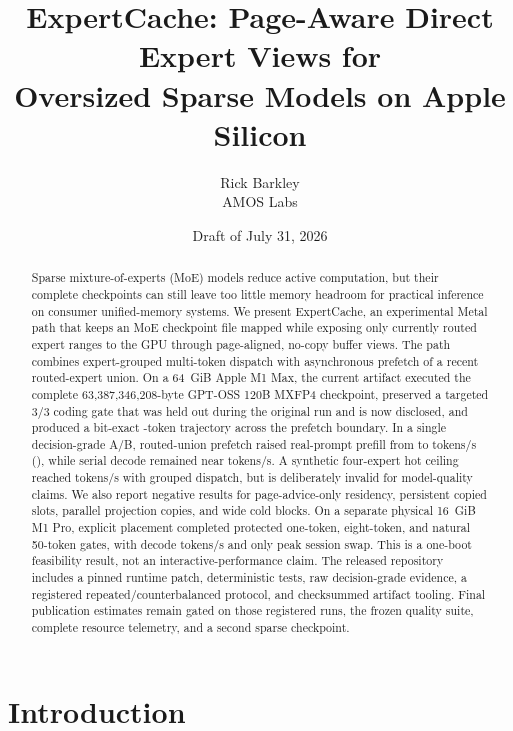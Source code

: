 \documentclass[10pt,twocolumn]{article}
\title{ExpertCache: Page-Aware Direct Expert Views for\\
Oversized Sparse Models on Apple Silicon}
\author{Rick Barkley\\AMOS Labs}
\date{Draft of July 31, 2026}
\newcommand{\system}{ExpertCache}
\begin{document}
\maketitle

\begin{abstract}
Sparse mixture-of-experts (MoE) models reduce active computation, but their
complete checkpoints can still leave too little memory headroom for practical
inference on consumer unified-memory systems.  We present \system, an
experimental Metal path that keeps an MoE checkpoint file mapped while
exposing only currently routed expert ranges to the GPU through page-aligned,
no-copy buffer views.  The path combines expert-grouped multi-token dispatch
with asynchronous prefetch of a recent routed-expert union.  On a 64~GiB Apple
M1 Max, the current artifact executed the complete 63,387,346,208-byte GPT-OSS
120B MXFP4 checkpoint, preserved a targeted 3/3 coding gate that was held out
during the original run and is now disclosed, and
produced a bit-exact \CurrentTrajectoryTokens-token trajectory across the
prefetch boundary.  In a single decision-grade A/B, routed-union prefetch
raised real-prompt prefill from \CurrentPrefetchControlRate{} to
\CurrentPrefetchRate{} tokens/s (\CurrentPrefetchGain), while serial decode
remained near \CurrentDecodeRange{} tokens/s.  A synthetic four-expert hot
ceiling reached \CurrentHotGroupedRate{} tokens/s with grouped dispatch, but
is deliberately invalid for model-quality claims.  We also report negative
results for page-advice-only residency, persistent copied slots, parallel
projection copies, and wide cold blocks.  On a separate physical 16~GiB M1
Pro, explicit placement completed protected one-token, eight-token, and
natural 50-token gates, with \CurrentSixteenDecodeRate{} decode tokens/s and
only \CurrentSixteenPeakSwap{} peak session swap.  This is a one-boot
feasibility result, not an interactive-performance claim.  The released
repository includes a
pinned runtime patch, deterministic tests, raw decision-grade evidence, a
registered repeated/counterbalanced protocol, and checksummed artifact
tooling.  Final publication estimates remain gated on those registered runs,
the frozen quality suite, complete resource telemetry, and a second sparse
checkpoint.
\end{abstract}

\section{Introduction}
\end{document}

